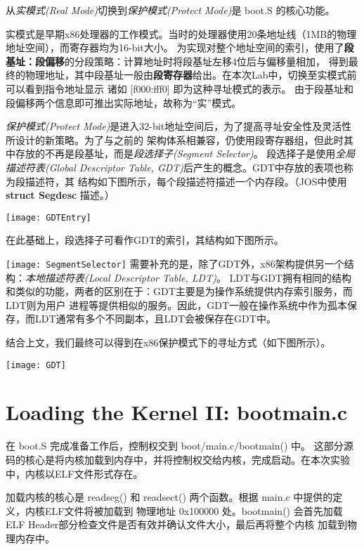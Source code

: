\documentclass[12pt, letterpaper]{report}
\begin{document}
从\textsl{实模式(Real Mode)}切换到\textsl{保护模式(Protect Mode)}是 boot.S 的核心功能。\par 
实模式是早期x86处理器的工作模式。当时的处理器使用20条地址线（1MB的物理地址空间），而寄存器均为16-bit大小。
为实现对整个地址空间的索引，使用了\textbf{段基址：段偏移}的分段策略：计算地址时将段基址左移4位后与偏移量相加，
得到最终的物理地址，其中段基址一般由\textbf{段寄存器}给出。在本次Lab中，切换至实模式前可以看到指令地址显示
诸如 [f000:fff0] 即为这种寻址模式的表示。
由于段基址和段偏移两个信息即可推出实际地址，故称为“实”模式。\par 
\textsl{保护模式(Protect Mode)}是进入32-bit地址空间后，为了提高寻址安全性及灵活性所设计的新策略。为了与之前的
架构体系相兼容，仍使用段寄存器组，但此时其中存放的不再是段基址，而是\textsl{段选择子(Segment Selector)}。
段选择子是使用\textsl{全局描述符表(Global Descriptor Table, GDT)}后产生的概念。GDT中存放的表项也称为段描述符，其
结构如下图所示，每个段描述符描述一个内存段。（JOS中使用 \textbf{struct Segdesc} 描述。）\par
\quad \par
\texttt{[image: GDTEntry]}
\quad \par
\quad \par
\quad \par
在此基础上，段选择子可看作GDT的索引，其结构如下图所示。\par 
\texttt{[image: SegmentSelector]}
需要补充的是，除了GDT外，x86架构提供另一个结构：\textsl{本地描述符表(Local Descriptor Table, LDT)}。
LDT与GDT拥有相同的结构和类似的功能，两者的区别在于：GDT主要是为操作系统提供内存索引服务，而LDT则为用户
进程等提供相似的服务。因此，GDT一般在操作系统中作为孤本保存，而LDT通常有多个不同副本，且LDT会被保存在GDT中。\par 
结合上文，我们最终可以得到在x86保护模式下的寻址方式（如下图所示）。\par 
\texttt{[image: GDT]}


\section[\large Loading the Kernel II: bootmain.c]{Loading the Kernel II: bootmain.c}
{
        在 boot.S 完成准备工作后，控制权交到 boot/main.c/bootmain() 中。
        这部分源码的核心是将内核加载到内存中，并将控制权交给内核，完成启动。在本次实验中，内核以ELF文件形式存在。\par 
        加载内核的核心是 readseg() 和 readsect() 两个函数。根据 main.c 中提供的定义，内核ELF文件将被加载到
        物理地址 0x100000 处。bootmain() 会首先加载ELF Header部分检查文件是否有效并确认文件大小，最后再将整个内核
        加载到物理内存中。
} \par 
\end{document}
